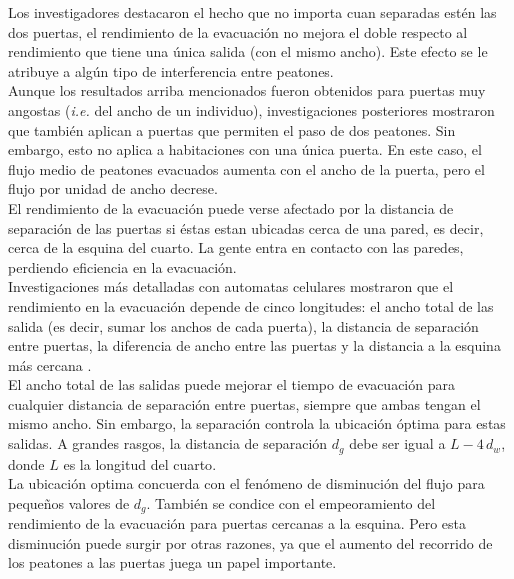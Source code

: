 Los investigadores destacaron el hecho que no importa cuan separadas estén las dos puertas, el rendimiento de la evacuación no mejora el doble respecto al rendimiento que tiene una única salida (con el mismo ancho). Este efecto se le atribuye a algún tipo de interferencia entre peatones\cite{perez1}.\\

Aunque los resultados arriba mencionados fueron obtenidos para puertas muy angostas (\emph{i.e.} del ancho de un individuo), investigaciones posteriores mostraron que también aplican a puertas que permiten el paso de dos peatones. Sin embargo, esto no aplica a habitaciones con una única puerta\cite{daoliang1}. En este caso, el flujo medio de peatones evacuados aumenta con el ancho de la puerta, pero el flujo por unidad de ancho decrese\cite{daoliang1}. \\
 
El rendimiento de la evacuación puede verse afectado por la distancia de separación de las puertas si éstas estan ubicadas cerca de una pared, es decir, cerca de la esquina del cuarto. La gente entra en contacto con las paredes, perdiendo eficiencia en la evacuación\cite{kirchner1,daoliang1}. \\

Investigaciones más detalladas con automatas celulares mostraron que el rendimiento en la evacuación depende de cinco longitudes: el ancho total de las salida (es decir, sumar los anchos de cada puerta), la distancia de separación entre puertas, la diferencia de ancho entre las puertas y la distancia a la esquina más cercana \cite{huanhuan1}. \\

El ancho total de las salidas puede mejorar el tiempo de evacuación para cualquier distancia de separación entre puertas, siempre que ambas tengan el mismo ancho. 
Sin embargo, la separación controla la ubicación óptima para
estas salidas. A grandes rasgos, la distancia de separación $d_g$ debe ser igual a $L-4\,d_w$, donde $L$ es la longitud del cuarto\cite{huanhuan1}. \\

La ubicación optima concuerda con el fenómeno de disminución del flujo para pequeños valores de $d_g$. También se condice con el empeoramiento del rendimiento de la evacuación para puertas cercanas a la esquina. Pero esta disminución puede surgir por otras razones, ya que el aumento del recorrido de los peatones a las puertas juega un papel importante.\\ 


